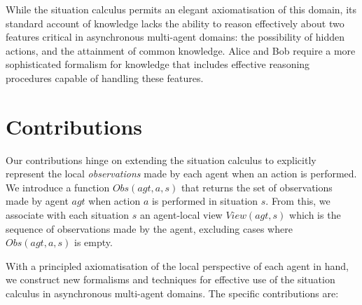 While the situation calculus permits an elegant axiomatisation of
this domain, its standard account of knowledge lacks the ability to
reason effectively about two features critical in asynchronous multi-agent
domains: the possibility of hidden actions, and the attainment of
common knowledge. Alice and Bob require a more sophisticated formalism
for knowledge that includes effective reasoning procedures capable
of handling these features.


\section{Contributions}

Our contributions hinge on extending the situation calculus to explicitly
represent the local \emph{observations} made by each agent when an
action is performed. We introduce a function $Obs(agt,a,s)$ that
returns the set of observations made by agent $agt$ when action $a$
is performed in situation $s$. From this, we associate with each
situation $s$ an agent-local view $View(agt,s)$ which is the sequence
of observations made by the agent, excluding cases where $Obs(agt,a,s)$
is empty.

With a principled axiomatisation of the local perspective of each
agent in hand, we construct new formalisms and techniques for effective
use of the situation calculus in asynchronous multi-agent domains.
The specific contributions are:

